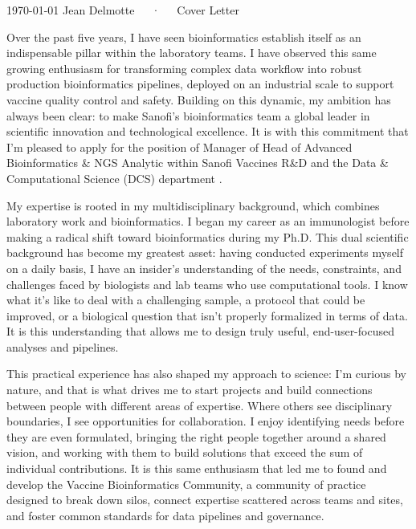 \documentclass[11pt, a4paper]{awesome-cv}
\begin{document}
\makecvheader[L]

\makecvfooter
  {\today}
  {Jean Delmotte~~~·~~~Cover Letter}
  {\thepage}
\makelettertitle

\begin{cvletter}

Over the past five years, I have seen bioinformatics establish itself as an indispensable pillar within the laboratory teams. I have observed this same growing enthusiasm for transforming complex data workflow into robust production bioinformatics pipelines, deployed on an industrial scale to support vaccine quality control and safety. Building on this dynamic, my ambition has always been clear: to make Sanofi’s bioinformatics team a global leader in scientific innovation and technological excellence. It is with this commitment that I'm pleased to apply for the position of Manager of Head of Advanced Bioinformatics \& NGS Analytic within Sanofi Vaccines R\&D and the Data \& Computational Science (DCS) department .

My expertise is rooted in my multidisciplinary background, which combines laboratory work and bioinformatics. I began my career as an immunologist before making a radical shift toward bioinformatics during my Ph.D. This dual scientific background has become my greatest asset: having conducted experiments myself on a daily basis, I have an insider’s understanding of the needs, constraints, and challenges faced by biologists and lab teams who use computational tools. I know what it’s like to deal with a challenging sample, a protocol that could be improved, or a biological question that isn’t properly formalized in terms of data. It is this understanding that allows me to design truly useful, end-user-focused analyses and pipelines.

This practical experience has also shaped my approach to science: I'm curious by nature, and that is what drives me to start projects and build connections between people with different areas of expertise. Where others see disciplinary boundaries, I see opportunities for collaboration. I enjoy identifying needs before they are even formulated, bringing the right people together around a shared vision, and working with them to build solutions that exceed the sum of individual contributions. It is this same enthusiasm that led me to found and develop the Vaccine Bioinformatics Community, a community of practice designed to break down silos, connect expertise scattered across teams and sites, and foster common standards for data pipelines and governance.


\end{cvletter}
\end{document}

